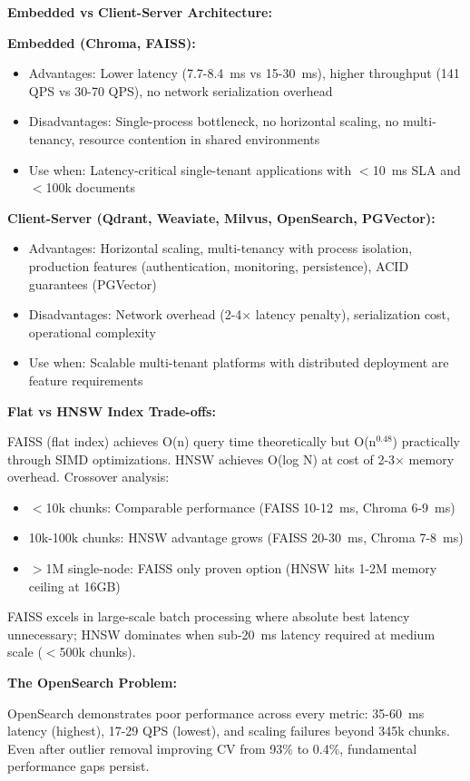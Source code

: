 \documentclass{article}
\begin{document}
\textbf{Embedded vs Client-Server Architecture:}

\textbf{Embedded (Chroma, FAISS):}
\begin{itemize}
    \item Advantages: Lower latency (7.7-8.4~ms vs 15-30~ms), higher throughput (141 QPS vs 30-70 QPS), no network serialization overhead
    \item Disadvantages: Single-process bottleneck, no horizontal scaling, no multi-tenancy, resource contention in shared environments
    \item Use when: Latency-critical single-tenant applications with $<$10~ms SLA and $<$100k documents
\end{itemize}

\textbf{Client-Server (Qdrant, Weaviate, Milvus, OpenSearch, PGVector):}
\begin{itemize}
    \item Advantages: Horizontal scaling, multi-tenancy with process isolation, production features (authentication, monitoring, persistence), ACID guarantees (PGVector)
    \item Disadvantages: Network overhead (2-4× latency penalty), serialization cost, operational complexity
    \item Use when: Scalable multi-tenant platforms with distributed deployment are feature requirements
\end{itemize}

\textbf{Flat vs HNSW Index Trade-offs:}

FAISS (flat index) achieves O(n) query time theoretically but O(n$^{0.48}$) practically through SIMD optimizations. HNSW achieves O(log N) at cost of 2-3× memory overhead. Crossover analysis:
\begin{itemize}
    \item $<$10k chunks: Comparable performance (FAISS 10-12~ms, Chroma 6-9~ms)
    \item 10k-100k chunks: HNSW advantage grows (FAISS 20-30~ms, Chroma 7-8~ms)
    \item $>$1M single-node: FAISS only proven option (HNSW hits 1-2M memory ceiling at 16GB)
\end{itemize}

FAISS excels in large-scale batch processing where absolute best latency unnecessary; HNSW dominates when sub-20~ms latency required at medium scale ($<$500k chunks).

\textbf{The OpenSearch Problem:}

OpenSearch demonstrates poor performance across every metric: 35-60~ms latency (highest), 17-29 QPS (lowest), and scaling failures beyond 345k chunks. Even after outlier removal improving CV from 93\% to 0.4\%, fundamental performance gaps persist.
\end{document}
